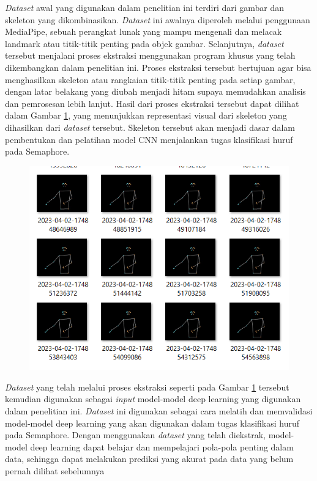 \textit{Dataset} awal yang digunakan dalam penelitian ini terdiri dari gambar dan skeleton yang dikombinasikan. \textit{Dataset} ini awalnya diperoleh melalui penggunaan MediaPipe, sebuah perangkat lunak yang mampu mengenali dan melacak landmark atau titik-titik penting pada objek gambar. Selanjutnya, \textit{dataset} tersebut menjalani proses ekstraksi menggunakan program khusus yang telah dikembangkan dalam penelitian ini. Proses ekstraksi tersebut bertujuan agar bisa menghasilkan skeleton atau rangkaian titik-titik penting pada setiap gambar, dengan latar belakang yang diubah menjadi hitam supaya memudahkan analisis dan pemrosesan lebih lanjut. Hasil dari proses ekstraksi tersebut dapat dilihat dalam Gambar \ref{fig:Datasetekstark}, yang menunjukkan representasi visual dari skeleton yang dihasilkan dari \textit{dataset} tersebut. Skeleton tersebut akan menjadi dasar dalam pembentukan dan pelatihan model CNN menjalankan tugas klasifikasi huruf pada Semaphore.

\begin{figure}[!hbt]
	\centering
	\includegraphics[width=0.6\linewidth]{gambar/bener/gambar_udah2.png}
	\label{fig:Datasetekstark}
\end{figure}

\textit{Dataset} yang telah melalui proses ekstraksi seperti pada Gambar \ref{fig:Datasetekstark} tersebut kemudian digunakan sebagai \textit{input}  model-model deep learning yang digunakan dalam penelitian ini. \textit{Dataset} ini digunakan sebagai cara melatih dan memvalidasi model-model deep learning yang akan digunakan dalam tugas klasifikasi huruf pada Semaphore. Dengan menggunakan \textit{dataset} yang telah diekstrak, model-model deep learning dapat belajar dan mempelajari pola-pola penting dalam data, sehingga dapat melakukan prediksi yang akurat pada data yang belum pernah dilihat sebelumnya

